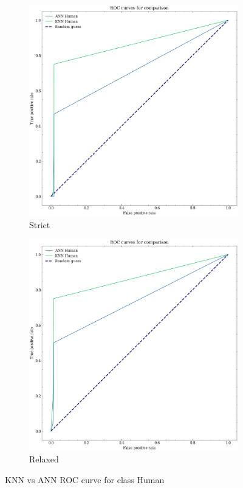 \begin{figure}
    \centering
    
    \begin{subfigure}[b]{0.45\textwidth}
            \includegraphics[width=\textwidth]{assets/evaluation_results/roc_curve_Human_strict.png}
            \caption{Strict}
    \end{subfigure}
    \hfill    
    \begin{subfigure}[b]{0.45\textwidth}
            \includegraphics[width=\textwidth]{assets/evaluation_results/roc_curve_Human_relaxed.png}
            \caption{Relaxed}
    \end{subfigure}
    \caption{KNN vs ANN ROC curve for class Human}
    \label{fig:knn-vs-ann-human-roc-curve-results}
\end{figure}

